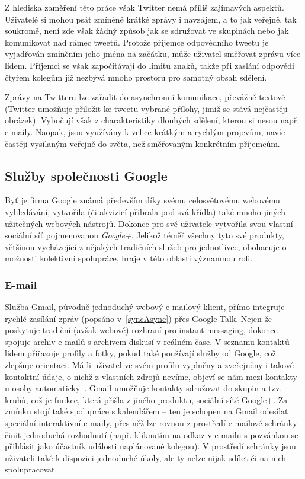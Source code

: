 \documentclass[12pt,oneside,final]{fithesis2}
\begin{document}
Z hlediska zaměření této práce však Twitter nemá příliš zajímavých aspektů. Uživatelé si mohou psát zmíněné krátké zprávy i navzájem, a to jak veřejně, tak soukromě, není zde však žádný způsob jak se sdružovat ve skupinách nebo jak komunikovat nad rámec tweetů. Protože příjemce odpovědního tweetu je vyjadřován zmíněním jeho jména na začátku, může uživatel směřovat zprávu více lidem. Příjemci se však započítávají do limitu znaků, takže při zaslání odpovědi čtyřem kolegům již nezbývá mnoho prostoru pro samotný obsah sdělení.

Zprávy na Twitteru lze zařadit do asynchronní komunikace, převážně textové (Twitter umožňuje přiložit ke tweetu vybrané přílohy, jimiž se stává nejčastěji obrázek). Vybočují však z charakteristiky dlouhých sdělení, kterou si nesou např. e-maily. Naopak, jsou využívány k velice krátkým a rychlým projevům, navíc častěji vysílaným veřejně do světa, než směřovaným konkrétním příjemcům.

\subsection{Služby společnosti Google}\label{google}
Byť je firma Google známá především díky svému celosvětovému webovému vyhledávání, vytvořila (či akvizicí přibrala pod svá křídla) také mnoho jiných užitečných webových nástrojů. Dokonce pro své uživatele vytvořila svou vlastní sociální síť pojmenovanou \emph{Google+}. Jelikož téměř všechny tyto své produkty, většinou vycházející z nějakých tradičních služeb pro jednotlivce, obohacuje o možnosti kolektivní spolupráce, hraje v této oblasti významnou roli.

\subsubsection*{E-mail}
Služba Gmail, původně jednoduchý webový e-mailový klient, přímo integruje rychlé zasílání zpráv (popsáno v~\ref{syncAsync}) přes Google Talk. Nejen že poskytuje tradiční (avšak webové) rozhraní pro instant messaging, dokonce spojuje archiv e-mailů s archivem diskusí v reálném čase. V seznamu kontaktů lidem přiřazuje profily a fotky, pokud také používají služby od Google, což zlepšuje orientaci. Má-li uživatel ve svém profilu vyplněny a zveřejněny i takové kontaktní údaje, o nichž z vlastních zdrojů nevíme, objeví se nám mezi kontakty u osoby automaticky~\cite{striebeck2010gmail}. Gmail umožňuje kontakty sdružovat do skupin a tzv. kruhů, což je funkce, která přišla z jiného produktu, sociální sítě Google+. Za zmínku stojí také spolupráce s kalendářem -- ten je schopen na Gmail odesílat speciální interaktivní e-maily, přes něž lze rovnou z prostředí e-mailové schránky činit jednoduchá rozhodnutí (např. kliknutím na odkaz v e-mailu s pozvánkou se přihlásit jako účastník události naplánované kolegou). V prostředí schránky jsou uživateli také k dispozici jednoduché úkoly, ale ty nelze nijak sdílet či na nich spolupracovat.
\end{document}
